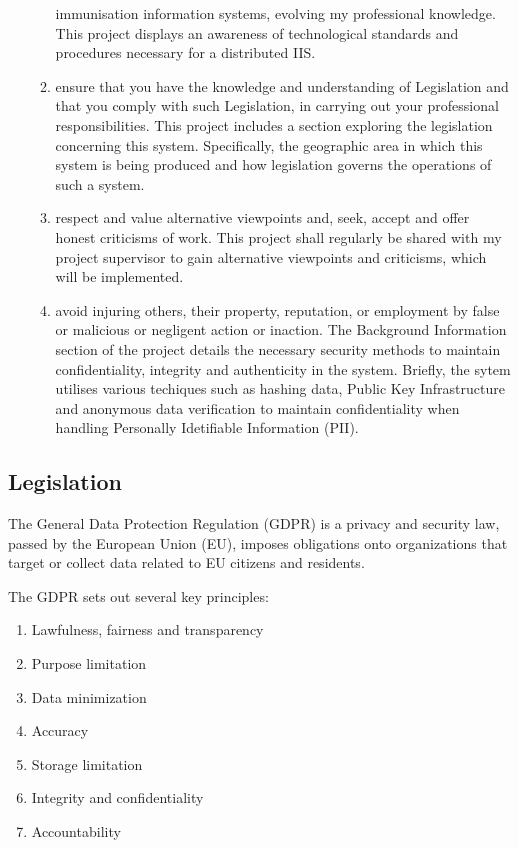 \begin{enumerate}
\begin{enumerate}
     immunisation information systems, evolving my
     professional knowledge. This project displays an
     awareness of technological standards and procedures necessary for a distributed IIS.
     \item ensure that you have the knowledge and
     understanding of Legislation and that you comply
     with such Legislation, in carrying out your
     professional responsibilities.
     This project includes a section exploring the
     legislation concerning this system. Specifically, the
     geographic area in which this system is being
     produced and how legislation governs the operations
     of such a system.
     \item respect and value alternative viewpoints and,
     seek, accept and offer honest criticisms of work.
     This project shall regularly be shared with my project
     supervisor to gain alternative viewpoints and
     criticisms, which will be implemented.
     \item avoid injuring others, their property, reputation,
     or employment by false or malicious or negligent
     action or inaction.
     The Background Information section of the project details the
     necessary security methods to maintain
     confidentiality, integrity and authenticity in the
     system. 
     Briefly, the sytem utilises various techiques such as hashing data, Public Key Infrastructure and anonymous data verification to maintain confidentiality when handling Personally Idetifiable Information (PII).
  \end{enumerate}
  \end{enumerate}
 
  \subsection{Legislation}
  The General Data Protection Regulation (GDPR) is a privacy
  and security law, passed by the European Union (EU),
  imposes obligations onto organizations that target or collect
  data related to EU citizens and residents. \cite{noauthor_general_nodate} \linebreak[1]
 
 The GDPR sets out several key principles:
 \begin{enumerate}
   \item Lawfulness, fairness and transparency
   \item Purpose limitation
   \item Data minimization
   \item Accuracy
   \item Storage limitation
   \item Integrity and confidentiality
   \item Accountability
 \end{enumerate}
 
